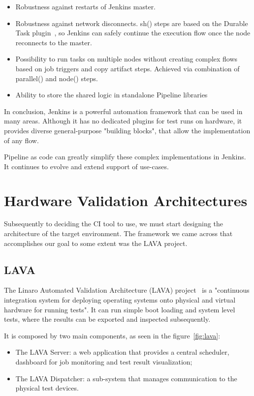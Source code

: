 \begin{itemize}
\item Robustness against restarts of Jenkins master.
\item Robustness against network disconnects. sh() steps are based on the Durable Task plugin~\cite{jnks:durableTask}, so Jenkins can safely continue the execution flow once the node reconnects to the master.
\item Possibility to run tasks on multiple nodes without creating complex flows based on job triggers and copy artifact steps. Achieved via combination of parallel() and node() steps.
\item Ability to store the shared logic in standalone Pipeline libraries
\end{itemize}

In conclusion, Jenkins is a powerful automation framework that can be used in many areas. Although it has no dedicated plugins for test runs on hardware, it provides diverse general-purpose "building blocks", that allow the implementation of any flow.

Pipeline as code can greatly simplify these complex implementations in Jenkins. It continues to evolve and extend support of use-cases.

\section{Hardware Validation Architectures}\label{sec:hw_val_arc}

Subsequently to deciding the CI tool to use, we must start designing the architecture of the target environment. The framework we came across that accomplishes our goal to some extent was the LAVA project.

\subsection{LAVA}\label{lava}

The Linaro Automated Validation Architecture (LAVA) project~\cite{kn:LAVA} is a "continuous integration system for deploying operating systems onto physical and virtual hardware for running tests". It can run simple boot loading and system level tests, where the results can be exported and inspected subsequently.

It is composed by two main components, as seen in the figure~\ref{fig:lava}: 

\begin{itemize}
\item The LAVA Server: a web application that provides a central scheduler, dashboard for job monitoring and test result visualization;
\item The LAVA Dispatcher: a sub-system that manages communication to the physical test devices.
\end{itemize}

